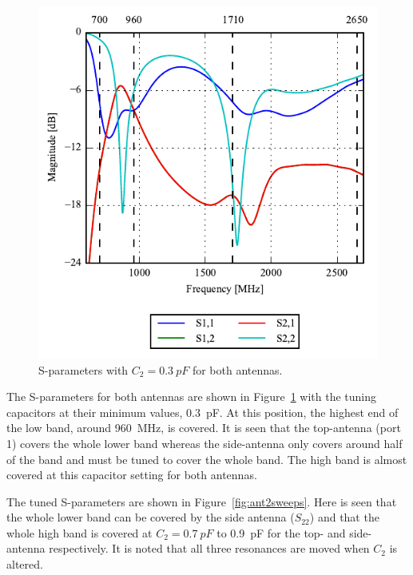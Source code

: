 \begin{figure}[htbp]
    \centering
    \includegraphics{img/tech_sol/trianglefeed/sparams}
    \caption{S-parameters with $C_2=\SI{0.3}{pF}$ for both antennas.}
    \label{fig:ant2sparams}
\end{figure}

The S-parameters for both antennas are shown in Figure~\ref{fig:ant2sparams} with the tuning capacitors at their minimum values, \SI{0.3}{pF}. At this position, the highest end of the low band, around \SI{960}{MHz}, is covered. It is seen that the top-antenna (port 1) covers the whole lower band whereas the side-antenna only covers around half of the band and must be tuned to cover the whole band. The high band is almost covered at this capacitor setting for both antennas.

The tuned S-parameters are shown in Figure~\ref{fig:ant2sweeps}. Here is seen that the whole lower band can be covered by the side antenna ($S_{22}$) and that the whole high band is covered at $C_2 = \SI{0.7}{pF}$ to \SI{0.9}{pF} for the top- and side-antenna respectively. It is noted that all three resonances are moved when $C_2$ is altered.

